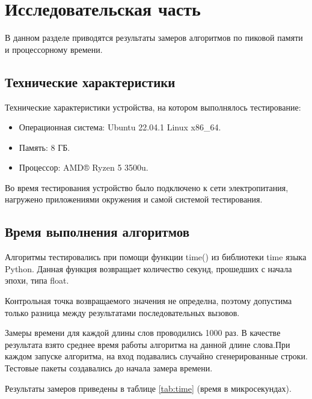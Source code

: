 \chapter{Исследовательская часть}

В данном разделе приводятся результаты замеров алгоритмов по пиковой памяти и процессорному времени.

\section{Технические характеристики}

Технические характеристики устройства, на котором выполнялось тестирование:

\begin{itemize}
	\item Операционная система: Ubuntu 22.04.1 \cite{ubuntu} Linux x86\_64.
	\item Память: 8 ГБ.
	\item Процессор: AMD® Ryzen 5 3500u.
\end{itemize}

Во время тестирования устройство было подключено к сети электропитания, нагружено приложениями окружения и самой  системой тестирования.

\section{Время выполнения алгоритмов}

Алгоритмы тестировались при помощи функции time() из библиотеки time языка Python. Данная функция возвращает количество секунд, прошедших с начала эпохи, типа float.

Контрольная точка возвращаемого значения не определна, поэтому допустима только разница между результатами последовательных вызовов.

Замеры времени для каждой длины слов проводились 1000 раз. В качестве результата взято среднее время работы алгоритма на данной длине слова.При каждом запуске алгоритма, на вход подавались случайно сгенерированные строки. Тестовые пакеты создавались до начала замера времени.

Результаты замеров приведены в таблице \ref{tab:time} (время в микросекундах).

